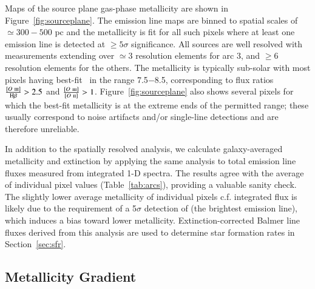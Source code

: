 Maps of the source plane gas-phase metallicity are shown in Figure~\ref{fig:sourceplane}. The emission line maps
are binned to spatial scales of $\simeq300-500$ pc and the metallicity is fit for all such pixels where at least
one emission line is detected at $\geq 5\sigma$ significance. All sources are well resolved with measurements
extending over $\simeq3$ resolution elements for arc 3, and $\geq 6$ resolution elements for the others. The
metallicity is typically sub-solar with most pixels having best-fit \oh\ in the range 7.5$-$8.5, corresponding to
flux ratios $\frac{\rm [O~\textsc{iii}]}{\rm{H} \beta} > 2.5$ and $\frac{\rm [O~\textsc{iii}]}{\rm
[O~\textsc{ii}]} > 1$. Figure~\ref{fig:sourceplane} also shows several pixels for which the best-fit metallicity
is at the extreme ends of the permitted range; these usually correspond to noise artifacts and/or single-line
detections and are therefore unreliable.

In addition to the spatially resolved analysis, we calculate galaxy-averaged metallicity and extinction by
applying the same analysis to total emission line fluxes measured from integrated 1-D spectra. The results agree
with the average of individual pixel values (Table~\ref{tab:arcs}), providing a valuable sanity check. The
slightly lower average metallicity of individual pixels c.f. integrated flux is likely due to the requirement of
a 5$\sigma$ detection of \OIII (the brightest emission line), which induces a bias toward lower metallicity.
Extinction-corrected Balmer line fluxes derived from this analysis are used to determine star formation rates in
Section~\ref{sec:sfr}.


\subsection{Metallicity Gradient}\label{sec:gradients}

